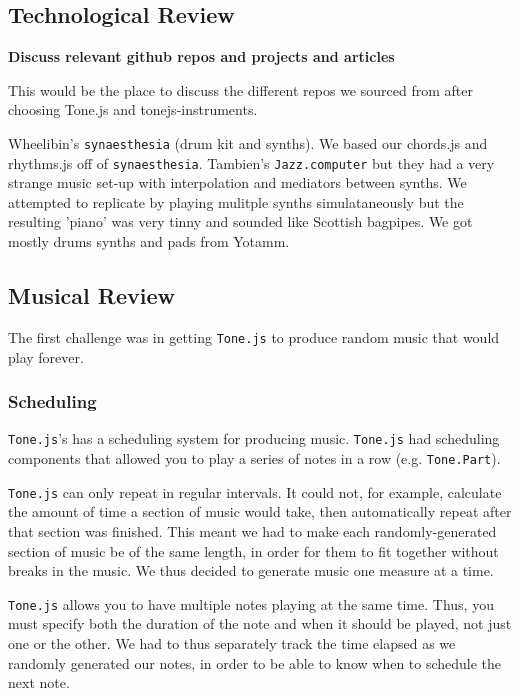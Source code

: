 \documentclass[12pt,a4paper]{article}
\newcommand{\lightcode}[1]{\colorbox{light-gray}{\texttt{#1}}}
\begin{document}
\subsection{Technological Review}
\textbf{Discuss relevant github repos and projects and articles}

This would be the place to discuss the different repos we sourced from after choosing Tone.js and tonejs-instruments.

Wheelibin's \lightcode{synaesthesia} (drum kit and synths). We based our chords.js and rhythms.js off of \lightcode{synaesthesia}. Tambien's \lightcode{Jazz.computer} but they had a very strange music set-up with interpolation and mediators between synths. We attempted to replicate by playing mulitple synths simulataneously but the resulting 'piano' was very tinny and sounded like Scottish bagpipes. We got mostly drums synths and pads from Yotamm.

\subsection{Musical Review}

The first challenge was in getting \lightcode{Tone.js} to produce random music that would play forever.

\subsubsection{Scheduling}
\lightcode{Tone.js}'s has a scheduling system for producing music. \lightcode{Tone.js} had scheduling components that allowed you to play a series of notes in a row (e.g. \lightcode{Tone.Part}).

\lightcode{Tone.js} can only repeat in regular intervals. It could not, for example, calculate the amount of time a section of music would take, then automatically repeat after that section was finished. This meant we had to make each randomly-generated section of music be of the same length, in order for them to fit together without breaks in the music. We thus decided to generate music one measure at a time.

\lightcode{Tone.js} allows you to have multiple notes playing at the same time. Thus, you must specify both the duration of the note and when it should be played, not just one or the other. We had to thus separately track the time elapsed as we randomly generated our notes, in order to be able to know when to schedule the next note.
\end{document}
